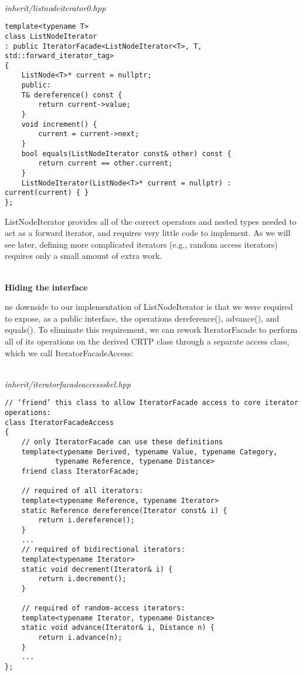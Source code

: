 \hspace*{\fill} \\ %
\noindent
\textit{inherit/listnodeiterator0.hpp}
\begin{lstlisting}[style=styleCXX]
template<typename T>
class ListNodeIterator
: public IteratorFacade<ListNodeIterator<T>, T,
std::forward_iterator_tag>
{
	ListNode<T>* current = nullptr;
	public:
	T& dereference() const {
		return current->value;
	}
	void increment() {
		current = current->next;
	}
	bool equals(ListNodeIterator const& other) const {
		return current == other.current;
	}
	ListNodeIterator(ListNode<T>* current = nullptr) : current(current) { }
};
\end{lstlisting}

ListNodeIterator provides all of the correct operators and nested types needed to act as a forward iterator, and requires very little code to implement. As we will see later, defining more complicated iterators (e.g., random access iterators) requires only a small amount of extra work.

\hspace*{\fill} \\ %
\noindent
\textbf{Hiding the interface}

ne downside to our implementation of ListNodeIterator is that we were required to expose, as a public interface, the operations dereference(), advance(), and equals(). To eliminate this requirement, we can rework IteratorFacade to perform all of its operations on the derived CRTP class through a separate access class, which we call IteratorFacadeAccess:

\hspace*{\fill} \\ %
\noindent
\textit{inherit/iteratorfacadeaccessskel.hpp}
\begin{lstlisting}[style=styleCXX]
// ‘friend’ this class to allow IteratorFacade access to core iterator operations:
class IteratorFacadeAccess
{
	// only IteratorFacade can use these definitions
	template<typename Derived, typename Value, typename Category,
			typename Reference, typename Distance>
	friend class IteratorFacade;
	
	// required of all iterators:
	template<typename Reference, typename Iterator>
	static Reference dereference(Iterator const& i) {
		return i.dereference();
	}
	...
	// required of bidirectional iterators:
	template<typename Iterator>
	static void decrement(Iterator& i) {
		return i.decrement();
	}

	// required of random-access iterators:
	template<typename Iterator, typename Distance>
	static void advance(Iterator& i, Distance n) {
		return i.advance(n);
	}
	...
};
\end{lstlisting}

